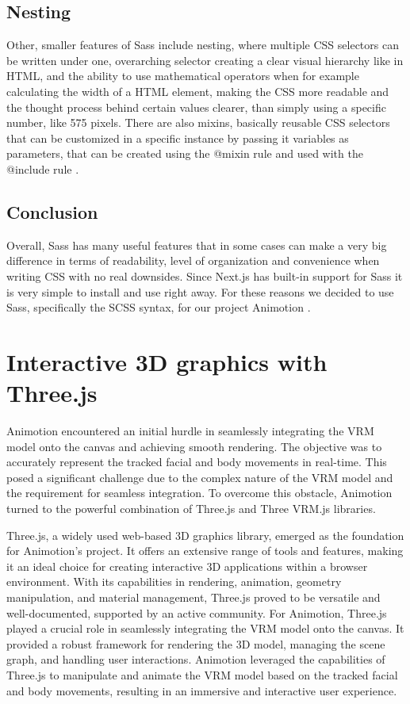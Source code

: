 \subsection{Nesting}
Other, smaller features of Sass include nesting, where multiple CSS selectors can be written under one, overarching selector creating a
clear visual hierarchy like in HTML, and the ability to use mathematical operators when for example calculating the width of a HTML
element, making the CSS more readable and the thought process behind certain values clearer, than simply using a specific number, like
575 pixels. There are also mixins, basically reusable CSS selectors that can be customized in a specific instance by passing it
variables as parameters, that can be created using the @mixin rule and used with the @include rule \cite{SassFeatures}.
\\
\subsection{Conclusion}
Overall, Sass has many useful features that in some cases can make a very big difference in terms of readability, level of organization and
convenience when writing CSS with no real downsides. Since Next.js has built-in support for Sass it is very simple to install and use right
away. For these reasons we decided to use Sass, specifically the SCSS syntax, for our project Animotion \cite{NextjsCSSSupport}.
\\

\section{Interactive 3D graphics with Three.js}
Animotion encountered an initial hurdle in seamlessly integrating the VRM model onto the canvas 
and achieving smooth rendering. The objective was to accurately represent the tracked facial and 
body movements in real-time. This posed a significant challenge due to the complex nature of the VRM 
model and the requirement for seamless integration. To overcome this obstacle, Animotion turned to the 
powerful combination of Three.js and Three VRM.js libraries.

Three.js, a widely used web-based 3D graphics library, emerged as the foundation for 
Animotion's project. It offers an extensive range of tools and features, making it an ideal 
choice for creating interactive 3D applications within a browser environment. With its capabilities 
in rendering, animation, geometry manipulation, and material management, Three.js proved to be 
versatile and well-documented, supported by an active community.
For Animotion, Three.js played a crucial role in seamlessly integrating the VRM model onto 
the canvas. It provided a robust framework for rendering the 3D model, managing the scene graph, 
and handling user interactions. Animotion leveraged the capabilities of Three.js to manipulate and 
animate the VRM model based on the tracked facial and body movements, resulting in an immersive and interactive user experience. \cite{threejs}


